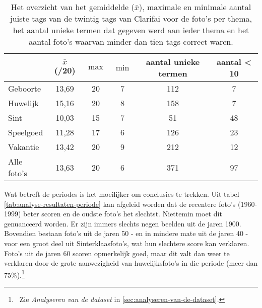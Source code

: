 \begin{table}
    \renewcommand\arraystretch{1.2}
    \centering
	\begin{tabular}{p{3cm}|ccccc}
	 	\toprule
		 & $\bar{x}$ (/20) & $\max$ & $\min$ & aantal unieke termen & aantal < 10 \\ 
		\midrule
		Geboorte & 13,69 & 20 & 7 & 112 & 7 \\ 
		Huwelijk & 15,16 & 20 & 8 & 158 & 7 \\ 
		Sint & 10,03 & 15 & 7 & 51 & 48 \\ 
		Speelgoed & 11,28 & 17 & 6 & 126 & 23 \\ 
		Vakantie & 13,42 & 20 & 9 & 212 & 12 \\ 
		Alle foto's & 13,63 & 20 & 6 & 371 & 97 \\ 
	\bottomrule
	\end{tabular} 
	\caption[Overzicht van de resultaten per thema na gebruikt van het ingebouwde model van Clarifai]{Het overzicht van het gemiddelde ($\bar{x}$), maximale en minimale aantal juiste tags van de twintig tags van Clarifai voor de foto’s per thema, het aantal unieke termen dat gegeven werd aan ieder thema en het aantal foto’s waarvan minder dan tien tags correct waren. }
	\label{tab:analyse-resultaten-thema}
\end{table}

Wat betreft de periodes is het moeilijker om conclusies te trekken. Uit tabel \ref{tab:analyse-resultaten-periode} kan afgeleid worden dat de recentere foto’s (1960-1999) beter scoren en de oudste foto’s het slechtst. Niettemin moet dit genuanceerd worden. Er zijn immers slechts negen beelden uit de jaren 1900. Bovendien bestaan foto’s uit de jaren 50 - en in mindere mate uit de jaren 40 - voor een groot deel uit Sinterklaasfoto’s, wat hun slechtere score kan verklaren. Foto’s uit de jaren 60 scoren opmerkelijk goed, maar dit valt dan weer te verklaren door de grote aanwezigheid van huwelijksfoto’s in die periode (meer dan 75\%).\footnote{~Zie \textit{Analyseren van de dataset} in \ref{sec:analyseren-van-de-dataset}.}

